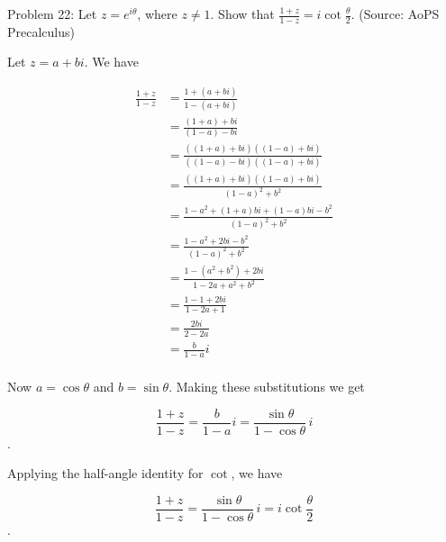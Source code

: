 Problem 22: Let $z = e^{i\theta}$, where $z\neq 1$. Show that $\frac{1+z}{1-z} = i\cot \frac{\theta}{2}$. (Source: AoPS Precalculus)

Let $z = a + bi$. We have

\begin{align*}
\frac{1 + z}{1 - z} &= \frac{1 + (a + bi)}{1 - (a + bi)} \\
&= \frac{(1 + a) + bi}{(1 - a) - bi} \\
&= \frac{((1 + a) + bi)((1 - a) + bi)}{((1 - a) - bi)((1 - a) + bi)} \\
&= \frac{((1 + a) + bi)((1 - a) + bi)}{(1 - a)^2 + b^2} \\
&= \frac{1 - a^2 + (1 + a)bi + (1 - a)bi - b^2}{(1 - a)^2 + b^2} \\
&= \frac{1 - a^2 + 2bi - b^2}{(1 - a)^2 + b^2} \\
&= \frac{1 - (a^2 + b^2) + 2bi}{1 - 2a + a^2 + b^2} \\
&= \frac{1 - 1 + 2bi}{1 - 2a + 1} \\
&= \frac{2bi}{2 - 2a} \\
&= \frac{b}{1 - a}i \\
\end{align*}

Now $a = \cos \theta$ and $b = \sin \theta$. Making these substitutions we get

$$ \frac{1 + z}{1 - z} = \frac{b}{1 - a}i = \frac{\sin \theta}{1 - \cos \theta} \, i$$.

Applying the half-angle identity for $\cot$, we have

$$ \frac{1 + z}{1 - z} = \frac{\sin \theta}{1 - \cos \theta} \, i = \boxed{i \cot \frac{\theta}{2}} $$.
